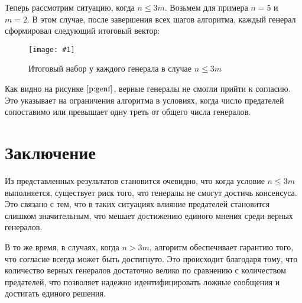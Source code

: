 \documentclass[a4paper,12pt]{article}
\newcommand{\plot}[4]{
    \begin{figure}[H]
        \begin{center}
            \texttt{[image: \#1]}
            \caption{#2}
            \label{#3}
        \end{center}
    \end{figure}
}
\begin{document}
    Теперь рассмотрим ситуацию, когда $ n \leq 3m $. Возьмем для примера $ n = 5 $ и $ m = 2 $. В этом случае, после завершения всех шагов алгоритма, каждый генерал сформировал следующий итоговый вектор:

    \plot{genf}{Итоговый набор у каждого генерала в случае $ n \leq 3m $}{p:genf}{0.6}

    Как видно на рисунке $ \ref{p:genf} $, верные генералы не смогли прийти к согласию.
    Это указывает на ограничения алгоритма в условиях, когда число предателей сопоставимо или превышает одну треть от общего числа генералов.

    \section{Заключение}
    Из представленных результатов становится очевидно, что когда условие $ n \leq 3m $ выполняется, существует риск того, что генералы не смогут достичь консенсуса. Это связано с тем, что в таких ситуациях влияние предателей становится слишком значительным, что мешает достижению единого мнения среди верных генералов.

    В то же время, в случаях, когда $ n > 3m $, алгоритм обеспечивает гарантию того, что согласие всегда может быть достигнуто. Это происходит благодаря тому, что количество верных генералов достаточно велико по сравнению с количеством предателей, что позволяет надежно идентифицировать ложные сообщения и достигать единого решения.
\end{document}

